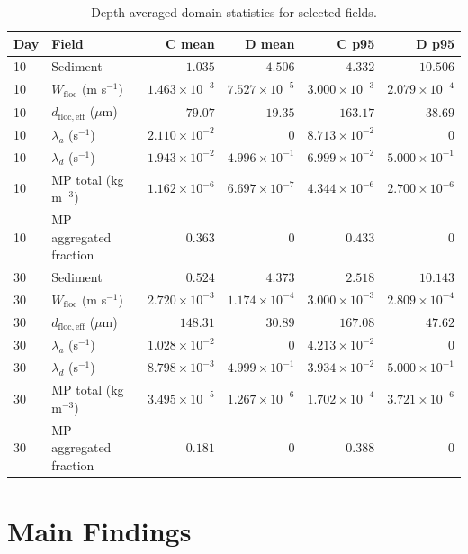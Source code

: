 \documentclass[11pt]{article}
\begin{document}
\begin{table}[h]
\centering
\caption{Depth-averaged domain statistics for selected fields.}
\label{tab:mainstats}
\begin{tabular}{llrrrr}
\toprule
Day & Field & C mean & D mean & C p95 & D p95 \\
\midrule
10 & Sediment & $1.035$ & $4.506$ & $4.332$ & $10.506$ \\
10 & $W_{\mathrm{floc}}$ (m s$^{-1}$) & $1.463{\times}10^{-3}$ & $7.527{\times}10^{-5}$ & $3.000{\times}10^{-3}$ & $2.079{\times}10^{-4}$ \\
10 & $d_{\mathrm{floc,eff}}$ ($\mu$m) & $79.07$ & $19.35$ & $163.17$ & $38.69$ \\
10 & $\lambda_a$ (s$^{-1}$) & $2.110{\times}10^{-2}$ & $0$ & $8.713{\times}10^{-2}$ & $0$ \\
10 & $\lambda_d$ (s$^{-1}$) & $1.943{\times}10^{-2}$ & $4.996{\times}10^{-1}$ & $6.999{\times}10^{-2}$ & $5.000{\times}10^{-1}$ \\
10 & MP total (kg m$^{-3}$) & $1.162{\times}10^{-6}$ & $6.697{\times}10^{-7}$ & $4.344{\times}10^{-6}$ & $2.700{\times}10^{-6}$ \\
10 & MP aggregated fraction & $0.363$ & $0$ & $0.433$ & $0$ \\
\midrule
30 & Sediment & $0.524$ & $4.373$ & $2.518$ & $10.143$ \\
30 & $W_{\mathrm{floc}}$ (m s$^{-1}$) & $2.720{\times}10^{-3}$ & $1.174{\times}10^{-4}$ & $3.000{\times}10^{-3}$ & $2.809{\times}10^{-4}$ \\
30 & $d_{\mathrm{floc,eff}}$ ($\mu$m) & $148.31$ & $30.89$ & $167.08$ & $47.62$ \\
30 & $\lambda_a$ (s$^{-1}$) & $1.028{\times}10^{-2}$ & $0$ & $4.213{\times}10^{-2}$ & $0$ \\
30 & $\lambda_d$ (s$^{-1}$) & $8.798{\times}10^{-3}$ & $4.999{\times}10^{-1}$ & $3.934{\times}10^{-2}$ & $5.000{\times}10^{-1}$ \\
30 & MP total (kg m$^{-3}$) & $3.495{\times}10^{-5}$ & $1.267{\times}10^{-6}$ & $1.702{\times}10^{-4}$ & $3.721{\times}10^{-6}$ \\
30 & MP aggregated fraction & $0.181$ & $0$ & $0.388$ & $0$ \\
\bottomrule
\end{tabular}
\end{table}

\section*{Main Findings}
\end{document}
